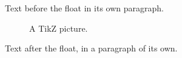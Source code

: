 \documentclass[12pt]{article}
\begin{document}
Text before the float in its own paragraph.

\begin{figure}[h]
\centering
{}
\caption{A TikZ picture.}
\end{figure}

Text after the float, in a paragraph of its own.
\end{document}

